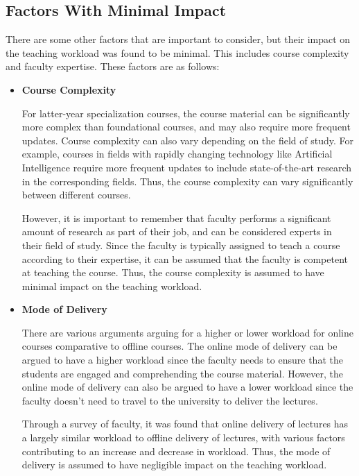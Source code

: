 \subsection{Factors With Minimal Impact}

There are some other factors that are important to consider, but their impact on the teaching workload was found to be minimal. This includes course complexity and faculty expertise. These factors are as follows:

\begin{itemize}
  \item  \textbf{Course Complexity}

        For latter-year specialization courses, the course material can be significantly more complex than foundational courses, and may also require more frequent updates. Course complexity can also vary depending on the field of study. For example, courses in fields with rapidly changing technology like Artificial Intelligence require more frequent updates to include state-of-the-art research in the corresponding fields. Thus, the course complexity can vary significantly between different courses.

        However, it is important to remember that faculty performs a significant amount of research as part of their job, and can be considered experts in their field of study. Since the faculty is typically assigned to teach a course according to their expertise, it can be assumed that the faculty is competent at teaching the course. Thus, the course complexity is assumed to have minimal impact on the teaching workload.

  \item \textbf{Mode of Delivery}

        There are various arguments arguing for a higher or lower workload for online courses comparative to offline courses. The online mode of delivery can be argued to have a higher workload since the faculty needs to ensure that the students are engaged and comprehending the course material. However, the online mode of delivery can also be argued to have a lower workload since the faculty doesn't need to travel to the university to deliver the lectures.

        Through a survey of faculty, it was found that online delivery of lectures has a largely similar workload to offline delivery of lectures, with various factors contributing to an increase and decrease in workload. Thus, the mode of delivery is assumed to have negligible impact on the teaching workload.

\end{itemize}

